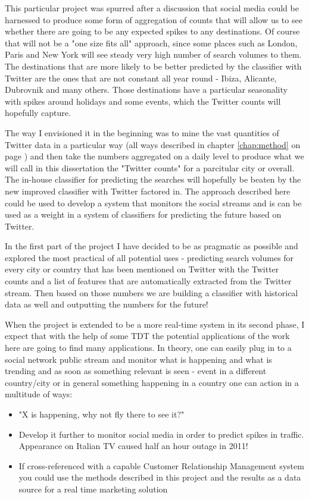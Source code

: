 \documentclass[minf,frontabs,twoside,singlespacing,parskip]{infthesis}
\begin{document}
This particular project was spurred after a discussion that social media could be harnessed to produce some form of aggregation of counts that will allow us to see whether there are going to be any expected spikes to any destinations. Of course that will not be a "one size fits all" approach, since some places such as London, Paris and New York will see steady very high number of search volumes to them. The destinations that are more likely to be better predicted by the classifier with Twitter are the ones that are not constant all year round - Ibiza, Alicante, Dubrovnik and many others. Those destinations have a particular seasonality with spikes around holidays and some events, which the Twitter counts will hopefully capture.


The way I envisioned it in the beginning was to mine the vast quantities of Twitter data in a particular way (all ways described in chapter \ref{chap:method} on page \pageref{chap:method}) and then take the numbers aggregated on a daily level to produce what we will call in this dissertation the "Twitter counts" for a parcitular city or overall. The in-house classifier for predicting the searches will hopefully be beaten by the new improved classifier with Twitter factored in. The approach described here could be used to develop a system that monitors the social streams and is can be used as a weight in a system of classifiers for predicting the future based on Twitter.


In the first part of the project I have decided to be as pragmatic as possible and explored the most practical of all potential uses - predicting search volumes for every city or country that has been mentioned on Twitter with the Twitter counts and a list of features that are automatically extracted from the Twitter stream. Then based on those numbers we are building a classifier with historical data as well and outputting the numbers for the future!


When the project is extended to be a more real-time system in its second phase, I expect that with the help of some TDT the potential applications of the work here are going to find many applications. In theory, one can easily plug in to a social network public stream and monitor what is happening and what is trending and as soon as something relevant is seen - event in a different country/city or in general something happening in a country one can action in a multitude of ways:

\begin{itemize}
\item "X is happening, why not fly there to see it?"
\item Develop it further to monitor social media in order to predict spikes in traffic. Appearance on Italian TV caused half an hour outage in 2011!
\item If cross-referenced with a capable Customer Relationship Management system you could use the methods described in this project and the results as a data source for a real time marketing solution
\end{itemize}
\end{document}
